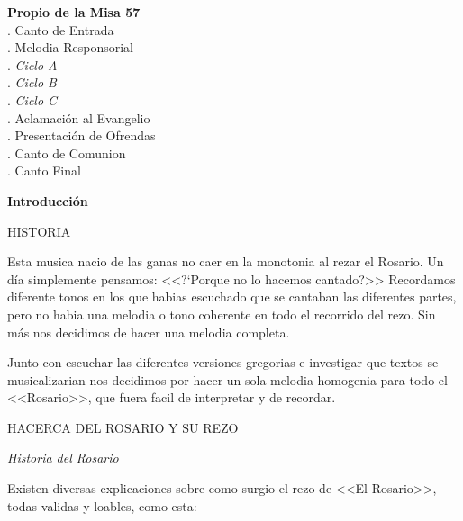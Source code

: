 \documentclass[12pt, letterpaper]{report}
\begin{document}
    \noindent
    \Large \textbf{Propio de la Misa \hfill{57}}\\
    .\hspace{1cm} \large Canto de Entrada \\
    .\hspace{1cm} \large Melodia Responsorial \\
    .\hspace{2cm} \large \textit{Ciclo A} \\
    .\hspace{2cm} \large \textit{Ciclo B} \\
    .\hspace{2cm} \large \textit{Ciclo C} \\
    .\hspace{1cm} \large Aclamaci\'on al Evangelio \\
    .\hspace{1cm} \large Presentación de Ofrendas \\
    .\hspace{1cm} \large Canto de Comunion \\
    .\hspace{1cm} \large Canto Final 
    \clearpage

    \begin{center}
        \vspace*{9cm}
        \textbf{\Huge Introducci\'on}
    \end{center}
    \clearpage
    
    \LARGE HISTORIA
    
    \Large Esta musica nacio de las ganas no caer en la monotonia al rezar el Rosario. Un d\'ia simplemente pensamos: <<?`Porque no lo hacemos cantado?>> Recordamos diferente tonos en los que habias 
    escuchado que se cantaban las diferentes partes, pero no habia una melodia o tono coherente en todo el recorrido del rezo. 
    Sin más nos decidimos de hacer una melodia completa.
    
    Junto con escuchar las diferentes versiones gregorias e investigar que textos se musicalizarian nos decidimos por hacer un sola melodia homogenia para todo el <<Rosario>>, que fuera facil de interpretar y de recordar.
    
    \LARGE HACERCA DEL ROSARIO Y SU REZO
    
    \LARGE \textit{Historia del Rosario}
    
    \Large Existen diversas explicaciones sobre como surgio el rezo de <<El Rosario>>, todas validas y loables, como esta:
    
\end{document}
